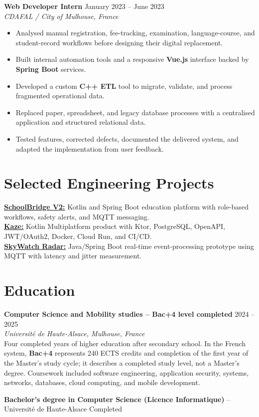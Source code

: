 \documentclass[10pt,a4paper]{article}
\begin{document}
\textbf{Web Developer Intern} \hfill January 2023 -- June 2023\\
\textit{CDAFAL / City of Mulhouse, France}
\begin{itemize}
  \item Analysed manual registration, fee-tracking, examination, language-course, and student-record workflows before designing their digital replacement.
  \item Built internal automation tools and a responsive \textbf{Vue.js} interface backed by \textbf{Spring Boot} services.
  \item Developed a custom \textbf{C++ ETL} tool to migrate, validate, and process fragmented operational data.
  \item Replaced paper, spreadsheet, and legacy database processes with a centralised application and structured relational data.
  \item Tested features, corrected defects, documented the delivered system, and adapted the implementation from user feedback.
\end{itemize}

\section{Selected Engineering Projects}
\textbf{\href{https://github.com/OresteGabo/SchoolBridgeV2}{SchoolBridge V2:}} Kotlin and Spring Boot education platform with role-based workflows, safety alerts, and MQTT messaging.\\
\textbf{\href{https://github.com/OresteGabo/kaze}{Kaze:}} Kotlin Multiplatform product with Ktor, PostgreSQL, OpenAPI, JWT/OAuth2, Docker, Cloud Run, and CI/CD.\\
\textbf{\href{https://github.com/OresteGabo/skywatch-radar}{SkyWatch Radar:}} Java/Spring Boot real-time event-processing prototype using MQTT with latency and jitter measurement.

\section{Education}
\textbf{Computer Science and Mobility studies -- Bac+4 level completed} \hfill 2024 -- 2025\\
\textit{Université de Haute-Alsace, Mulhouse, France}\\
Four completed years of higher education after secondary school. In the French system, \textbf{Bac+4} represents 240 ECTS credits and completion of the first year of the Master's study cycle; it describes a completed study level, not a Master's degree. Coursework included software engineering, application security, systems, networks, databases, cloud computing, and mobile development.

\textbf{Bachelor's degree in Computer Science (Licence Informatique)} -- Université de Haute-Alsace \hfill Completed
\end{document}
